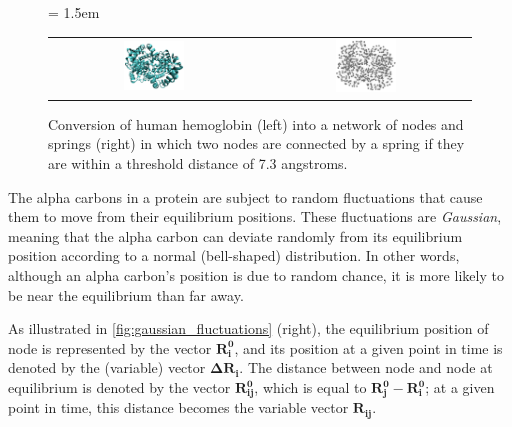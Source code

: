 \begin{figure}[h]
	\centering
	\tabcolsep = 1.5em
	\mySfFamily
	\begin{tabular}{c c}
		\includegraphics[width = 0.3\textwidth]{../images/hemoglobin.png} & \includegraphics[width = 0.3\textwidth]{../images/hemoglobin_network.png}
	\end{tabular}
	\caption{Conversion of human hemoglobin (left) into a network of nodes and springs (right) in which two nodes are connected by a spring if they are within a threshold distance of 7.3 angstroms.}
	\label{fig:hemoglobin_enm}
\end{figure}

The alpha carbons in a protein are subject to random fluctuations that cause them to move from their equilibrium positions. These fluctuations are \textit{Gaussian}, meaning that the alpha carbon can deviate randomly from its equilibrium position according to a normal (bell-shaped) distribution. In other words, although an alpha carbon's position is due to random chance, it is more likely to be near the equilibrium than far away.

As illustrated in \autoref{fig:gaussian_fluctuations} (right), the equilibrium position of node  is represented by the vector $\mathbf{R_i^0}$, and its position at a given point in time is denoted by the (variable) vector $ \mathbf{\Delta R_i}$. The distance between node  and node  at equilibrium is denoted by the vector $\mathbf{R_{ij}^0}$, which is equal to $\mathbf{R_j^0} - \mathbf{R_i^0}$; at a given point in time, this distance becomes the variable vector $\mathbf{R_{ij}}$.

